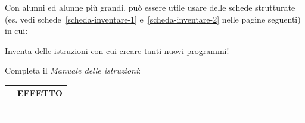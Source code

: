 Con alunni ed alunne più grandi, può essere utile usare delle schede strutturate (es. vedi schede~\ref{scheda-inventare-1} e~\ref{scheda-inventare-2} nelle pagine seguenti) in cui:\label{richiamo:cap03-schede-1ab}
\begin{scheda}[A1][3]
\label{scheda-inventare-1}
\hspace*{12mm}\begin{minipage}{\dimexpr\linewidth-12mm\relax}
Inventa delle istruzioni con cui creare tanti nuovi programmi!\par
Completa il \emph{Manuale delle istruzioni}:
\end{minipage}\par
\vspace{8mm}
\begingroup
\setlength{\tabcolsep}{3mm}
\setlength{\arrayrulewidth}{0.6pt}
\renewcommand{\arraystretch}{1}
\noindent\begin{tabular}{|p{}|p{}|}
\hline
\rowcolor{black!10}
\multicolumn{1}{|c|}{\rule[-3mm]{0pt}{10mm}\fontsize{15}{18}\selectfont\textbf{ISTRUZIONI DISPONIBILI}} &
\multicolumn{1}{c|}{\fontsize{15}{18}\selectfont\textbf{EFFETTO}} \\
\hline
\rule{0pt}{24mm} & \\\hline
\rule{0pt}{24mm} & \\\hline
\rule{0pt}{24mm} & \\\hline
\rule{0pt}{24mm} & \\\hline
\rule{0pt}{24mm} & \\\hline
\end{tabular}\par
\endgroup
\end{scheda}

